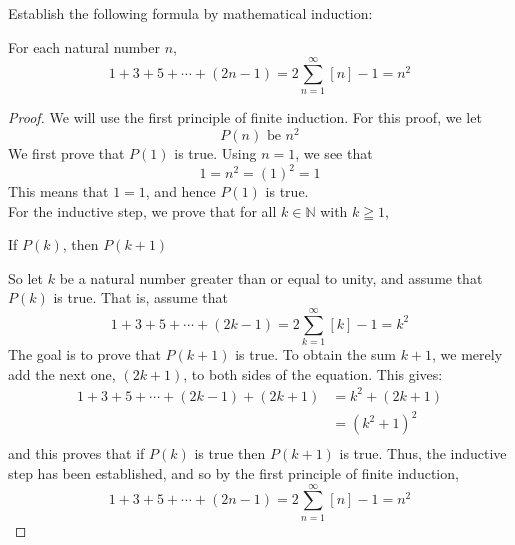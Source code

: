 \newpage
\begin{example}
Establish the following formula by mathematical induction:
    
    \begin{tcolorbox}
        \begin{theorem}
            For each natural number $n$,
                \begin{equation*}
                    1 + 3 + 5  +\cdots + (2n - 1) = 2\sum_{n=1}^{\infty}{[n]} - 1 = n^2
                \end{equation*}
        \end{theorem}
    \end{tcolorbox}

    \begin{proof}
        We will use the first principle of finite induction. For this proof, we let
            \begin{equation*}
                P(n) \text{ be } n^2
            \end{equation*}
        We first prove that $P(1)$ is true. Using $n=1$, we see that
            \begin{equation*}
                1 = n^2 = (1)^2 = 1
            \end{equation*}
        This means that $1=1$, and hence $P(1)$ is true. \\
        For the inductive step, we prove that for all $k \in \mathbb{N}$ with $k \geqq 1$, 
            \begin{center}
                If $P(k)$, then $P(k+1)$
            \end{center}
        So let $k$ be a natural number greater than or equal to unity, and assume that $P(k)$ is true. That is, assume that 
            \begin{equation*}
               1 + 3 + 5  +\cdots + (2k - 1) = 2\sum_{k=1}^{\infty}{[k]} - 1 = k^2
            \end{equation*}
        The goal is to prove that $P(k+1)$ is true. To obtain the sum $k+1$, we merely add the next one, $(2k + 1)$, to both sides of the equation. This gives: 
            \begin{align*}
                1 + 3 + 5  +\cdots + (2k - 1) + (2k + 1) & = k^2 + (2k + 1) \\
                    & = (k^2 + 1)^2 \\
            \end{align*}
        and this proves that if $P(k)$ is true then $P(k+1)$ is true. Thus, the inductive step has been established, and so by the first principle of finite induction,
            \begin{equation*}
                1 + 3 + 5  +\cdots + (2n - 1) = 2\sum_{n=1}^{\infty}{[n]} - 1 = n^2
            \end{equation*}
    \end{proof}
\end{example}


